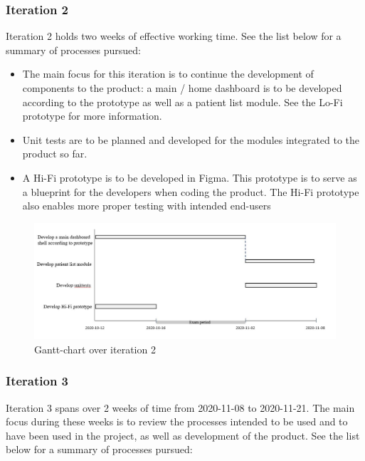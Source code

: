 \subsubsection{Iteration 2}
Iteration 2 holds two weeks of effective working time. See the list below for a summary of processes pursued:

\begin{itemize}
    \item The main focus for this iteration is to continue the development of components to the product: a main / home dashboard is to be developed according to the prototype as well as a patient list module. See the Lo-Fi prototype for more information.
    \item Unit tests are to be planned and developed for the modules integrated to the product so far.
    \item A Hi-Fi prototype is to be developed in Figma. This prototype is to serve as a blueprint for the developers when coding the product. The Hi-Fi prototype also enables more proper testing with intended end-users
\end{itemize} 

\begin{figure}[H]
\centering
\includegraphics[width=\linewidth]{Pictures/iteration_2.JPG}
\caption{Gantt-chart over iteration 2}
\label{fig:iteration_2}
\end{figure}

\subsubsection{Iteration 3}

Iteration 3 spans over 2 weeks of time from 2020-11-08 to 2020-11-21. The main focus during these weeks is to review the processes intended to be used and to have been used in the project, as well as development of the product. See the list below for a summary of processes pursued:

